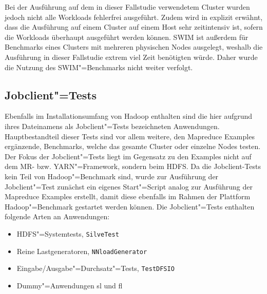 Bei der Ausführung auf dem in dieser Fallstudie verwendetem Cluster wurden jedoch nicht alle Workloads fehlerfrei ausgeführt.
Zudem wird in \cite{InriaTutorial} explizit erwähnt, dass die Ausführung auf einem Cluster auf einem Host sehr zeitintensiv ist, sofern die Workloads überhaupt ausgeführt werden können.
\ac{SWIM} ist außerdem für Benchmarks eines Clusters mit mehreren physischen Nodes ausgelegt, weshalb die Ausführung in dieser Fallstudie extrem viel Zeit benötigten würde.
Daher wurde die Nutzung des \ac{SWIM}"=Benchmarks nicht weiter verfolgt.

\subsection{Jobclient"=Tests}
\label{subsec:jobclient}

Ebenfalls im Installationsumfang von Hadoop enthalten sind die hier aufgrund ihres Dateinamens als Jobclient"=Tests bezeichneten Anwendungen.
Hauptbestandteil dieser Tests sind vor allem weitere, den Mapreduce Examples ergänzende, Benchmarks, welche das gesamte Cluster oder einzelne Nodes testen.
Der Fokus der Jobclient"=Tests liegt im Gegensatz zu den Examples nicht auf dem \ac{MR}- bzw. \ac{YARN}"=Framework, sondern beim \ac{HDFS}.
Da die Jobclient-Tests kein Teil von Hadoop"=Benchmark sind, wurde zur Ausführung der Jobclient"=Test zunächst ein eigenes Start"=Script analog zur Ausführung der Mapreduce Examples erstellt, damit diese ebenfalls im Rahmen der Plattform Hadoop"=Benchmark gestartet werden können.
Die Jobclient"=Tests enthalten \uA folgende Arten an Anwendungen:

\begin{itemize}
    \item \ac{HDFS}"=Systemtests, \zB \texttt{SilveTest}
    \item Reine Lastgeneratoren, \zB \texttt{NNloadGenerator}
    \item Eingabe/Ausgabe"=Durchsatz"=Tests, \zB \texttt{TestDFSIO}
    \item Dummy"=Anwendungen \acl{sl} und \acl{fl}
\end{itemize}
